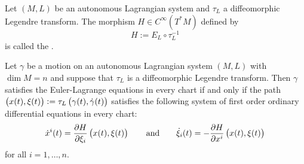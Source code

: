 \begin{definition}
	Let $(M,L)$ be an autonomous Lagrangian system and $\tau_L$ a diffeomorphic Legendre transform. The morphism $H \in C^\infty(T^*M)$ defined by
	\begin{equation*}
		H := E_L \circ \tau_L^{-1}
	\end{equation*}
	\noindent is called the .
\end{definition}

\begin{theorem}
	\label{thm:Hamiltons_equations}
	Let $\gamma$ be a motion on an autonomous Lagrangian system $(M,L)$ with $\dim M = n$ and suppose that $\tau_L$ is a diffeomorphic Legendre transform. Then $\gamma$ satisfies the Euler-Lagrange equations in every chart if and only if the path $\del[1]{x(t),\xi(t)} := \tau_L\del[1]{\gamma(t),\dot{\gamma}(t)}$ satisfies the following system of first order ordinary differential equations in every chart:
	\begin{equation*}
		\dot{x}^i(t) = \frac{\partial H}{\partial \xi_i}\del[1]{x(t),\xi(t)} \qquad \text{and} \qquad \dot{\xi}_i(t) = -\frac{\partial H}{\partial x^i}\del[1]{x(t),\xi(t)}
	\end{equation*}
	\noindent for all $i = 1,\dots,n$.
\end{theorem}
